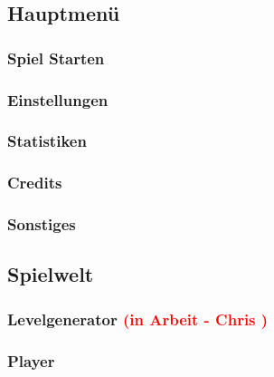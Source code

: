 \documentclass{article}
\begin{document}
\vspace{2cm}
\subsection{Hauptmenü}

\vspace{1cm}
\subsubsection{Spiel Starten}

\vspace{1cm}
\subsubsection{Einstellungen}

\vspace{1cm}
\subsubsection{Statistiken}

\vspace{1cm}
\subsubsection{Credits}

\vspace{1cm}
\subsubsection{Sonstiges}

\vspace{2cm}
\subsection{Spielwelt}

\vspace{1cm}
\subsubsection{Levelgenerator  \textcolor{red}{(in Arbeit - Chris )}}

\vspace{1cm}
\subsubsection{Player}

\vspace{1cm}
\end{document}
